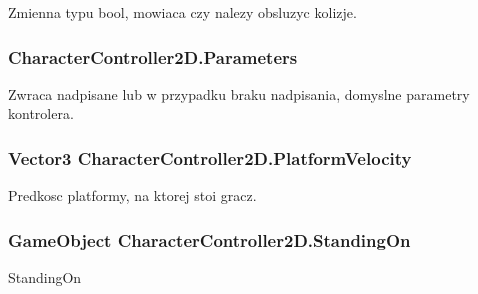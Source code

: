 Zmienna typu bool, mowiaca czy nalezy obsluzyc kolizje. 

\hypertarget{class_character_controller2_d_a408542bab9592c3d0d4ca432a5775ce6}{}
\subsubsection[{Parameters}]{ Character\+Controller2\+D.\+Parameters\hspace{0.3cm}{\ttfamily [get]}}\label{class_character_controller2_d_a408542bab9592c3d0d4ca432a5775ce6}


Zwraca nadpisane lub w przypadku braku nadpisania, domyslne parametry kontrolera. 

\hypertarget{class_character_controller2_d_a9eaf0dd583c426b16264c87a7d64d993}{}
\subsubsection[{Platform\+Velocity}]{\setlength{\rightskip}{0pt plus 5cm}Vector3 Character\+Controller2\+D.\+Platform\+Velocity\hspace{0.3cm}{\ttfamily [get]}}\label{class_character_controller2_d_a9eaf0dd583c426b16264c87a7d64d993}


Predkosc platformy, na ktorej stoi gracz. 

\hypertarget{class_character_controller2_d_ae2f301ab8f2d3b4290a2780d021e44fb}{}
\subsubsection[{Standing\+On}]{\setlength{\rightskip}{0pt plus 5cm}Game\+Object Character\+Controller2\+D.\+Standing\+On\hspace{0.3cm}{\ttfamily [get]}}\label{class_character_controller2_d_ae2f301ab8f2d3b4290a2780d021e44fb}


Standing\+On 

\hypertarget{class_character_controller2_d_a5e65ffc5d4f73920480727f2bf58e978}{}
